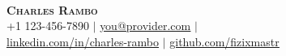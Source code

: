 \documentclass[letterpaper,11pt]{article} %
\begin{document}
\begin{comment}
In Europe it is common to include a picture of ones self in the CV. Select
which heading appropriate for the document you are creating.
\end{comment}

\begin{minipage}[c]{0.05\textwidth}
  \-\
\end{minipage}

\begin{center}
  \textbf{\Huge \scshape Charles Rambo} \\ \vspace{1pt} %
  \small +1 123-456-7890 $|$
  \href{mailto:you@provider.com}{\underline{you@provider.com}} $|$\\
  \href{https://linkedin.com/in/your-name-here}{\underline{linkedin.com/in/charles-rambo}} $|$
  \href{https://github.com/fizixmastr}{\underline{github.com/fizixmastr}}
\end{center}



\begin{comment}
This CV was written for specifically for positions I was applying for in
academia, and then modified to be a template.

A standard CV is about two pages long where as a resume in the US is one page.
sections can be added and removed here with this in mind. In my experience,
education, and applicable work experience and skills are the most import things
to include on a resume. For a CV the Europass CV suggests the categories: Work
Experience, Education and Training, Language Skills, Digital Skills,
Communication and Interpersonal Skills, Conferences and Seminars, Creative Works
Driver's License, Hobbies and Interests, Honors and Awards, Management and
Leadership Skills, Networks and Memberships, Organizational Skills, Projects,
Publications, Recommendations, Social and Political Activities, Volunteering.

Your goal is to convey a who, what , when, where, why for every item you share.
The who is obviously you, but I believe the rest should be done in that order.
For example below. An employer cares most about the degree held and typically
less about the institution or where it is located (This is still good
information though). Whatever order you choose be consistent throughout.
\end{comment}
\end{document}

